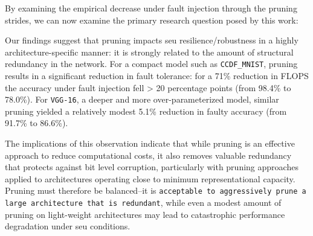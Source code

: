 By examining the empirical decrease under fault injection through the pruning strides, we can now examine the primary research question posed by this work: 

Our findings suggest that pruning impacts \gls{seu} resilience/robustness in a highly architecture-specific manner: it is strongly related to the amount of structural redundancy in the network. For a compact model such as \texttt{CCDF\_MNIST}, pruning results in a significant reduction in fault tolerance: for a 71\% reduction in FLOPS the accuracy under fault injection fell > 20 percentage points (from 98.4\% to 78.0\%). For \texttt{VGG-16}, a deeper and more over-parameterized model, similar pruning yielded a relatively modest 5.1\% reduction in faulty accuracy (from 91.7\% to 86.6\%). 

The implications of this observation indicate that while pruning is an effective approach to reduce computational costs, it also removes valuable redundancy that protects against bit level corruption, particularly with pruning approaches applied to architectures operating close to minimum representational capacity. Pruning must therefore be balanced--it is \texttt{acceptable to aggressively prune a large architecture that is redundant}, while even a modest amount of pruning on light-weight architectures may lead to catastrophic performance degradation under \gls{seu} conditions.